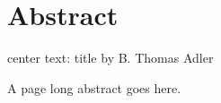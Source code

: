 \chapter{Abstract}

center text: title
          by
     B. Thomas Adler

A page long abstract goes here.


